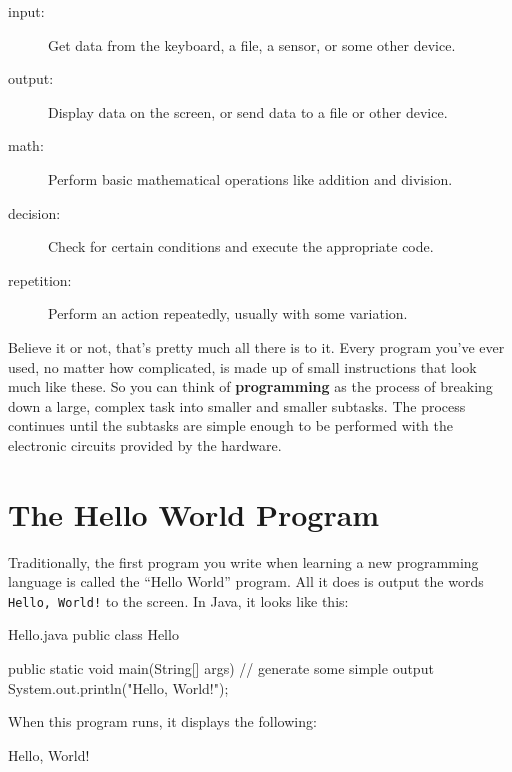 \begin{description}
\item[input:] Get data from the keyboard, a file, a sensor, or some other device.
\item[output:] Display data on the screen, or send data to a file or other device.
\item[math:] Perform basic mathematical operations like addition and division.
\item[decision:] Check for certain conditions and execute the appropriate code.
\item[repetition:] Perform an action repeatedly, usually with some variation.
\end{description}


Believe it or not, that's pretty much all there is to it.
Every program you've ever used, no matter how complicated, is made up of small instructions that look much like these.
So you can think of {\bf programming} as the process of breaking down a large, complex task into smaller and smaller subtasks.
The process continues until the subtasks are simple enough to be performed with the electronic circuits provided by the hardware.


\section{The Hello World Program}
\label{hello}

Traditionally, the first program you write when learning a new programming language is called the ``Hello World'' program.
All it does is output the words {\tt Hello, World!} to the screen.
In Java, it looks like this:



\begin{trinket}[235]{Hello.java}
public class Hello {

    public static void main(String[] args) {
        // generate some simple output
        System.out.println("Hello, World!");
    }
}
\end{trinket}

When this program runs, it displays the following:

\begin{stdout}
Hello, World!
\end{stdout}

